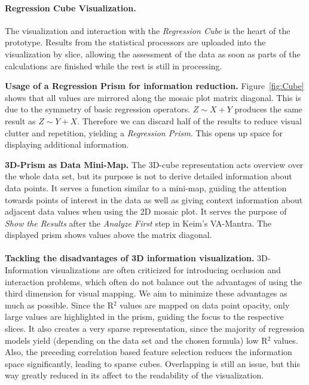 \documentclass[journal]{style/vgtc} 			          %
\newcommand{\com}[1]{\textcolor{orange}{\uline{#1}}}
\begin{document}

\paragraph{Regression Cube Visualization.}
The visualization and interaction with the \emph{Regression Cube} is the heart of the prototype.
Results from the statistical processors are uploaded into the visualization by slice, allowing the assessment of the data as soon as parts of the calculations are finished while the rest is still in processing.

\textbf{Usage of a Regression Prism for information reduction.}
Figure~\ref{fig:Cube} shows that all values are mirrored along the mosaic plot matrix diagonal.
This is due to the symmetry of basic regression operators.
$Z \sim X + Y$ produces the same result as $Z \sim Y + X$.
Therefore we can discard half of the results to reduce visual clutter and repetition, yielding a \emph{Regression Prism}.
This opens up space for displaying additional information.

\textbf{3D-Prism as Data Mini-Map.}
The 3D-cube representation acts overview over the whole data set, but its purpose is not to derive detailed information about data points.
It serves a function similar to a mini-map, guiding the attention towards points of interest in the data as well as giving context information about adjacent data values when using the 2D mosaic plot.
It serves the purpose of \emph{Show the Results} after the \emph{Analyze First} step in Keim's VA-Mantra.
The displayed prism shows values above the matrix diagonal.
\\\\
\textbf{Tackling the disadvantages of 3D information visualization.}
3D-Information visualizations are often criticized for introducing occlusion and interaction problems, which often do not balance out the advantages of using the third dimension for visual mapping.
We aim to minimize these advantages as much as possible.
Since the R$^2$ values are mapped on data point opacity, only large values are highlighted in the prism, guiding the focus to the respective slices.
It also creates a very sparse representation, since the majority of regression models yield (depending on the data set and the chosen formula) low R$^2$ values.
Also, the preceding correlation based feature selection reduces the information space significantly, leading to sparse cubes.
Overlapping is still an issue, but this way greatly reduced in its affect to the readability of the visualization.
\end{document}
